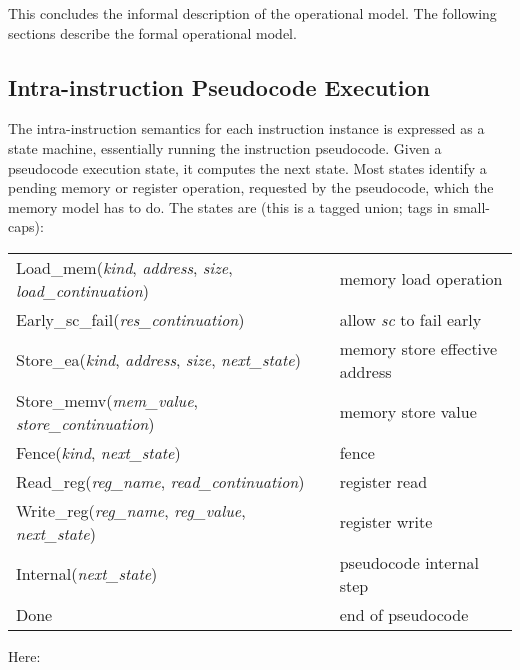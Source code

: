 This concludes the informal description of the operational model.
The following sections describe the formal operational model.

\subsection{Intra-instruction Pseudocode Execution}\label{sec:omm:pseudocode_exec}
The intra-instruction semantics for each instruction instance is expressed as a state machine, essentially running the instruction pseudocode.
Given a pseudocode execution state, it computes the next state.  Most
states identify a pending memory or register operation, requested by
the pseudocode, which the memory model has to do.  The
states are (this is a tagged union; tags in small-caps):

\begin{center}
\begin{tabular}{l@{ \quad-\quad }l}
{\sc Load\_mem}({\it kind}, {\it address}, {\it size}, {\it load\_continuation})
    & memory load operation\\
{\sc Early\_sc\_fail}({\it res\_continuation})
    & allow {\em sc} to fail early\\
{\sc Store\_ea}({\it kind}, {\it address}, {\it size}, {\it next\_state})
    & memory store effective address\\
{\sc Store\_memv}({\it mem\_value}, {\it store\_continuation})
    & memory store value\\
{\sc Fence}({\it kind}, {\it next\_state})
    & fence\\
{\sc Read\_reg}({\it reg\_name}, {\it read\_continuation})
    & register read\\
{\sc Write\_reg}({\it reg\_name}, {\it reg\_value}, {\it next\_state})
    & register write\\
{\sc Internal}({\it next\_state})
    & pseudocode internal step\\
{\sc Done}
    & end of pseudocode\\
\end{tabular}
\end{center}
Here:
